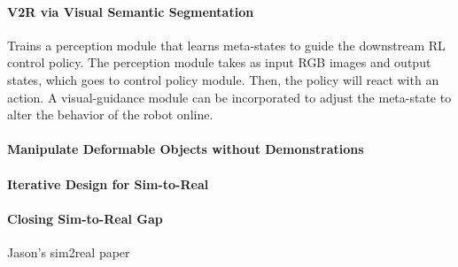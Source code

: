 \paragraph{V2R via Visual Semantic Segmentation~\citep{Hong2018V2R}}
Trains a perception module that learns meta-states to guide the downstream RL control policy. The perception module takes as input RGB images and output states, which goes to control policy module. Then, the policy will react with an action. A visual-guidance module can be incorporated to adjust the meta-state to alter the behavior of the robot online.

\paragraph{Manipulate Deformable Objects without Demonstrations~\citep{Wu2020Deform}}

\paragraph{Iterative Design for Sim-to-Real~\citep{Xie2019Cassie}}


\paragraph{Closing Sim-to-Real Gap~\citep{chebotar2018closing}}

Jason's sim2real paper